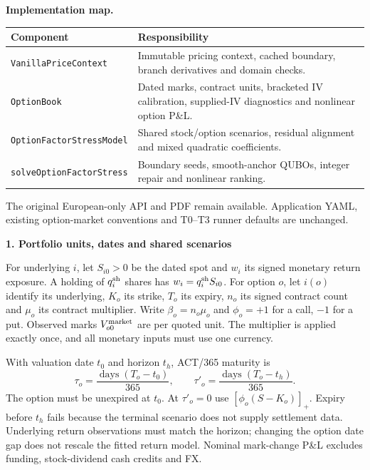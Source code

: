 \documentclass[11pt,a4paper]{article}
\begin{document}
\textbf{Implementation map.}
\begin{center}\small
\begin{tabular}{p{.43\linewidth}p{.49\linewidth}}
\toprule
Component & Responsibility\\\midrule
\texttt{VanillaPriceContext} & Immutable pricing context, cached boundary, branch derivatives and domain checks.\\
\texttt{OptionBook} & Dated marks, contract units, bracketed IV calibration, supplied-IV diagnostics and nonlinear option P\&L.\\
\texttt{OptionFactorStressModel} & Shared stock/option scenarios, residual alignment and mixed quadratic coefficients.\\
\texttt{solveOptionFactorStress} & Boundary seeds, smooth-anchor QUBOs, integer repair and nonlinear ranking.\\
\bottomrule
\end{tabular}\end{center}
The original European-only API and PDF remain available. Application YAML,
existing option-market conventions and T0--T3 runner defaults are unchanged.

\newpage
\textbf{1. Portfolio units, dates and shared scenarios}

For underlying $i$, let $S_{i0}>0$ be the dated spot and $w_i$ its signed monetary
return exposure. A holding of $q_i^{\rm sh}$ shares has $w_i=q_i^{\rm sh}S_{i0}$.
For option $o$, let $i(o)$ identify its underlying, $K_o$ its strike, $T_o$ its
expiry, $n_o$ its signed contract count and $\mu_o$ its contract multiplier.
Write $\beta_o=n_o\mu_o$ and $\phi_o=+1$ for a call, $-1$ for a put.
Observed marks $V_{o0}^{\rm market}$ are per quoted unit. The multiplier is
applied exactly once, and all monetary inputs must use one currency.

With valuation date $t_0$ and horizon $t_h$, ACT/365 maturity is
\[
 \tau_o=\frac{\operatorname{days}(T_o-t_0)}{365},\qquad
 \tau'_o=\frac{\operatorname{days}(T_o-t_h)}{365}.
\]
The option must be unexpired at $t_0$. At $\tau'_o=0$ use
$[\phi_o(S-K_o)]_+$. Expiry before $t_h$ fails because the terminal scenario
does not supply settlement data. Underlying return observations must match the
horizon; changing the option date gap does not rescale the fitted return model.
Nominal mark-change P\&L excludes funding, stock-dividend cash credits and FX.
\end{document}
